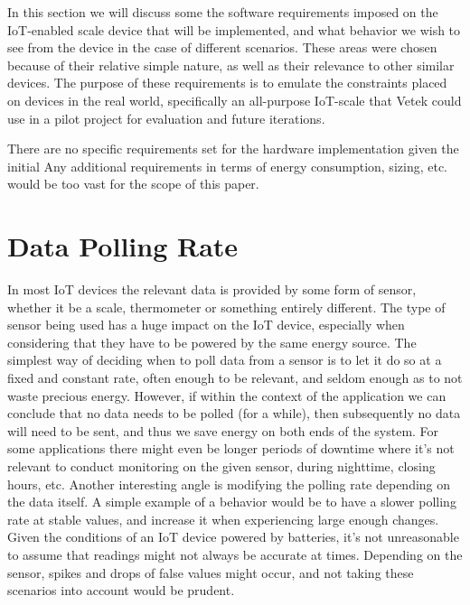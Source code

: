 





In this section we will discuss some the software requirements imposed on the IoT-enabled scale device that will be implemented, and what behavior we wish to see from the device in the case of different scenarios. These areas were chosen because of their relative simple nature, as well as their relevance to other similar devices. The purpose of these requirements is to emulate the constraints placed on devices in the real world, specifically an all-purpose IoT-scale that Vetek could use in a pilot project for evaluation and future iterations. 

There are no specific requirements set for the hardware implementation given the initial  Any additional requirements in terms of energy consumption, sizing, etc. would be too vast for the scope of this paper. 

\section{Data Polling Rate}
In most IoT devices the relevant data is provided by some form of sensor, whether it be a scale, thermometer or something entirely different.\cite{what_is_iot} The type of sensor being used has a huge impact on the IoT device, especially when considering that they have to be powered by the same energy source. The simplest way of deciding when to poll data from a sensor is to let it do so at a fixed and constant rate, often enough to be relevant, and seldom enough as to not waste precious energy. However, if within the context of the application we can conclude that no data needs to be polled (for a while), then subsequently no data will need to be sent, and thus we save energy on both ends of the system. For some applications there might even be longer periods of downtime where it's not relevant to conduct monitoring on the given sensor, \eg during nighttime, closing hours, etc. Another interesting angle is modifying the polling rate depending on the data itself. A simple example of a behavior would be to have a slower polling rate at stable values, and increase it when experiencing large enough changes. Given the conditions of an IoT device powered by batteries, it's not unreasonable to assume that readings might not always be accurate at times. Depending on the sensor, spikes and drops of false values might occur, and not taking these scenarios into account would be prudent. 

